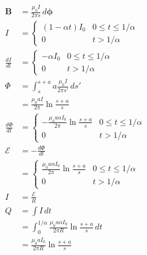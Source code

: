 \documentclass{article}
\renewcommand{\vec}[1]{\boldsymbol{\mathbf{#1}}}
\newcommand{\uvec}[1]{\hat{\vec{#1}}}
\begin{document}
\begin{align*}
  \vec{B}            & = \frac{\mu_0 I}{2 \pi s} \,d \uvec{\phi}                                          \\
  I                  & = \begin{cases}
                           (1 - \alpha t) I_0 & 0 \le t \le 1 / \alpha \\
                           0                  & t > 1 / \alpha
                         \end{cases}                                      \\
  \frac{d I}{d t}    & = \begin{cases}
                           -\alpha I_0 & 0 \le t \le 1 / \alpha \\
                           0           & t > 1 / \alpha
                         \end{cases}                                             \\
  \Phi               & = \int_s^{s + a} a \frac{\mu_0 I}{2 \pi s'} \,d s'                                 \\
                     & = \frac{\mu_0 a I}{2 \pi} \ln \frac{s + a}{s}                                      \\
  \frac{d \Phi}{d t} & = \begin{cases}
                           -\frac{\mu_0 a \alpha I_0}{2 \pi} \ln \frac{s + a}{s} & 0 \le t \le 1 / \alpha \\
                           0                                                     & t > 1 / \alpha
                         \end{cases}   \\
  \mathcal{E}        & = -\frac{d \Phi}{d t}                                                              \\
                     & = \begin{cases}
                           \frac{\mu_0 a \alpha I_0}{2 \pi} \ln \frac{s + a}{s} & 0 \le t \le 1 / \alpha \\
                           0                                                    & t > 1 / \alpha
                         \end{cases}    \\
  I                  & = \frac{\mathcal{E}}{R}                                                            \\
  Q                  & = \int I \,d t                                                                     \\
                     & = \int_0^{1 / \alpha} \frac{\mu_0 a \alpha I_0}{2 \pi R} \ln \frac{s + a}{s} \,d t \\
                     & = \frac{\mu_0 a I_0}{2 \pi R} \ln \frac{s + a}{s}
\end{align*}
\end{document}
